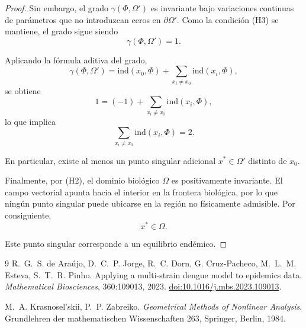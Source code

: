 \documentclass{article}
\numberwithin{equation}{section}
\begin{document}
\begin{proof}
Sin embargo, el grado $\gamma(\Phi,\Omega')$ es invariante
bajo variaciones continuas de parámetros que no introduzcan ceros
en $\partial \Omega'$.
Como la condición (H3) se mantiene, el grado sigue siendo
\[
\gamma(\Phi,\Omega')=1.
\]

Aplicando la fórmula aditiva del grado,
\[
\gamma(\Phi,\Omega')
=
\mathrm{ind}(x_0,\Phi)
+
\sum_{x_i \neq x_0} \mathrm{ind}(x_i,\Phi),
\]
se obtiene
\[
1
=
(-1)
+
\sum_{x_i \neq x_0} \mathrm{ind}(x_i,\Phi),
\]
lo que implica
\[
\sum_{x_i \neq x_0} \mathrm{ind}(x_i,\Phi)=2.
\]

En particular, existe al menos un punto singular adicional
$x^\ast \in \Omega'$ distinto de $x_0$.

Finalmente, por (H2), el dominio biológico $\Omega$
es positivamente invariante. El campo vectorial apunta hacia el interior
en la frontera biológica, por lo que ningún punto singular puede ubicarse
en la región no físicamente admisible.
Por consiguiente,
\[
x^\ast \in \Omega.
\]

Este punto singular corresponde a un equilibrio endémico.

\end{proof}

\begin{thebibliography}{9}
R.~G.~S. de Araújo, D.~C.~P. Jorge, R.~C. Dorn, G. Cruz-Pacheco, M.~L.~M. Esteva, S.~T.~R. Pinho.
\newblock Applying a multi-strain dengue model to epidemics data.
\newblock \emph{Mathematical Biosciences}, 360:109013, 2023.
\newblock \href{https://doi.org/10.1016/j.mbs.2023.109013}{doi:10.1016/j.mbs.2023.109013}.

M.~A. Krasnosel'skii, P.~P. Zabreiko.
\newblock \emph{Geometrical Methods of Nonlinear Analysis}.
\newblock Grundlehren der mathematischen Wissenschaften 263, Springer, Berlin, 1984.
\end{thebibliography}
\end{document}
